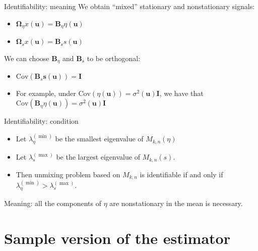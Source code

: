 \documentclass{beamer}
\begin{document}

\begin{frame}{Identifiability: meaning}
  We obtain ``mixed'' stationary and nonstationary signals:
  \begin{itemize}
    \item $\bm\Omega_\eta x(\bm u) = \bm B_\eta \eta(\bm u)$
    \item $\bm\Omega_s x(\bm u) = \bm B_s s(\bm u)$
  \end{itemize}
  \pause
  We can choose $\bm B_\eta$ and $\bm B_s$ to be orthogonal:
  \begin{itemize}
    \item $\mathrm{Cov}\left(\bm B_s \bm s(\bm u)\right) = \bm I$
    \item For example, under $\mathrm{Cov}(\eta(\bm u)) = \sigma^2(\bm u)\bm I$,
    we have that $\mathrm{Cov}\left(\bm B_\eta \eta(\bm u)\right) = \sigma^2(\bm
    u)\bm I$
  \end{itemize}
\end{frame}


\begin{frame}{Identifiability: condition}
  \begin{itemize}
    \item Let $\lambda_\eta^{(\min)}$ be the smallest eigenvalue of $M_{k,
    n}(\eta)$
    \item Let $\lambda_s^{(\max)}$ be the largest eigenvalue of $M_{k, n}(s)$.
    \pause
    \item Then unmixing problem based on $M_{k, n}$ is identifiable if and
    only if $\lambda_\eta^{(\min)} > \lambda_s^{(\max)}$.
  \end{itemize}
  \pause
  Meaning: all the components of $\eta$ are nonstationary in the mean is
  necessary.
\end{frame}


\section{Sample version of the estimator}

\end{document}
